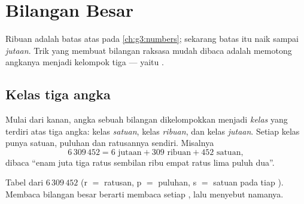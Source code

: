 \chapter{Bilangan Besar}\label{ch:g4:numbers}

Ribuan adalah batas atas pada \cref{ch:g3:numbers}; sekarang batas
itu naik sampai \emph{jutaan}. Trik yang membuat bilangan raksasa
mudah dibaca adalah memotong angkanya menjadi kelompok tiga --- yaitu
.

\section{Kelas tiga angka}

\begin{definition}[Kelas]\label{def:g4:numbers:classes}
Mulai dari kanan, angka sebuah bilangan dikelompokkan menjadi
\emph{kelas} yang terdiri atas tiga angka: kelas \emph{satuan}, kelas
\emph{ribuan}, dan kelas \emph{jutaan}. Setiap kelas punya satuan,
puluhan dan ratusannya sendiri. Misalnya
\[
6\,309\,452 = 6 \text{ jutaan} + 309 \text{ ribuan}
+ 452 \text{ satuan},
\]
dibaca ``enam juta tiga ratus sembilan ribu
empat ratus lima puluh dua''.
\end{definition}

\begin{omfigure}

{\small Tabel  dari $6\,309\,452$ (r $=$ ratusan, p $=$
puluhan, s $=$ satuan pada tiap ). Membaca bilangan besar
berarti membaca setiap , lalu menyebut namanya.}
\end{omfigure}

